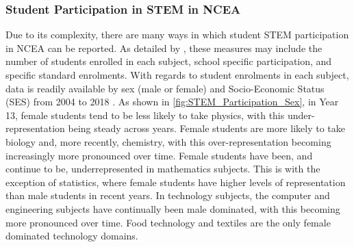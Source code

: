 \documentclass[a4paper]{article}
\begin{document}
\subsubsection{Student Participation in STEM in NCEA}
Due to its complexity, there are many ways in which student STEM participation in NCEA can be reported. As detailed by \cite{hipkins2005staying}, these measures may include the number of students enrolled in each subject, school specific participation, and specific standard enrolments. With regards to student enrolments in each subject, data is readily available by sex (male or female) and Socio-Economic Status (SES) from 2004 to 2018 \cite{EducationCounts_2018}. As shown in \ref{fig:STEM_Participation_Sex}, in Year 13, female students tend to be less likely to take physics, with this under-representation being steady across years. Female students are more likely to take biology and, more recently, chemistry, with this over-representation becoming increasingly more pronounced over time. Female students have been, and continue to be, underrepresented in mathematics subjects. This is with the exception of statistics, where female students have higher levels of representation than male students in recent years. In technology subjects, the computer and engineering subjects have continually been male dominated, with this becoming more pronounced over time. Food technology and textiles are the only female dominated technology domains. 
\end{document}
